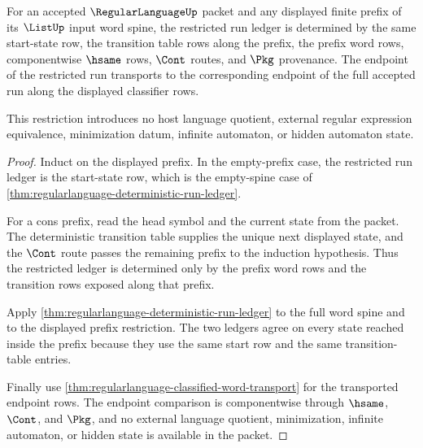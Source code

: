 \begin{theorem}
\label{thm:regularlanguage-run-prefix-restriction}
For an accepted $\RegularLanguageUp$ packet and any displayed finite prefix of
its $\ListUp$ input word spine, the restricted run ledger is determined by the
same start-state row, the transition table rows along the prefix, the prefix
word rows, componentwise $\hsame$ rows, $\Cont$ routes, and $\Pkg$ provenance.
The endpoint of the restricted run transports to the corresponding endpoint of
the full accepted run along the displayed classifier rows.

This restriction introduces no host language quotient, external regular
expression equivalence, minimization datum, infinite automaton, or hidden
automaton state.
\end{theorem}
\begin{proof}
Induct on the displayed prefix. In the empty-prefix case, the restricted run
ledger is the start-state row, which is the empty-spine case of
\autoref{thm:regularlanguage-deterministic-run-ledger}.

For a cons prefix, read the head symbol and the current state from the packet.
The deterministic transition table supplies the unique next displayed state,
and the $\Cont$ route passes the remaining prefix to the induction hypothesis.
Thus the restricted ledger is determined only by the prefix word rows and the
transition rows exposed along that prefix.

Apply \autoref{thm:regularlanguage-deterministic-run-ledger} to the full word
spine and to the displayed prefix restriction. The two ledgers agree on every
state reached inside the prefix because they use the same start row and the
same transition-table entries.

Finally use \autoref{thm:regularlanguage-classified-word-transport} for the
transported endpoint rows. The endpoint comparison is componentwise through
$\hsame$, $\Cont$, and $\Pkg$, and no external language quotient,
minimization, infinite automaton, or hidden state is available in the packet.
\end{proof}

